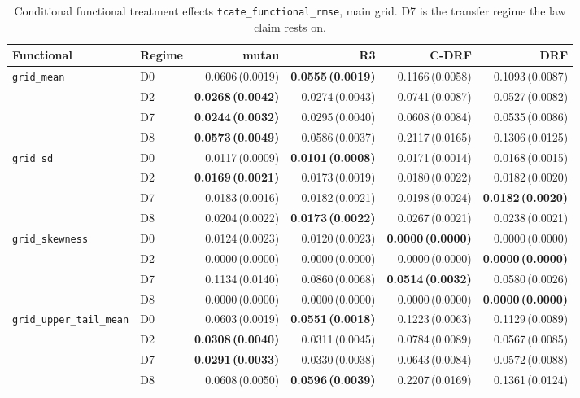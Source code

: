 \begin{table}[htbp]
\centering
\caption{Conditional functional treatment effects \texttt{tcate\_functional\_rmse}, main grid. D7 is the transfer regime the law claim rests on.}
\label{tab:p55-tcate}
\scriptsize
\setlength{\tabcolsep}{3.2pt}
\begin{tabular}{@{}llrrrr@{}}
\toprule
Functional & Regime & mutau & R3 & C-DRF & DRF \\
\midrule
\texttt{grid\_mean} & D0 & 0.0606\,(0.0019) & \textbf{0.0555\,(0.0019)} & 0.1166\,(0.0058) & 0.1093\,(0.0087) \\
 & D2 & \textbf{0.0268\,(0.0042)} & 0.0274\,(0.0043) & 0.0741\,(0.0087) & 0.0527\,(0.0082) \\
 & D7 & \textbf{0.0244\,(0.0032)} & 0.0295\,(0.0040) & 0.0608\,(0.0084) & 0.0535\,(0.0086) \\
 & D8 & \textbf{0.0573\,(0.0049)} & 0.0586\,(0.0037) & 0.2117\,(0.0165) & 0.1306\,(0.0125) \\
\midrule
\texttt{grid\_sd} & D0 & 0.0117\,(0.0009) & \textbf{0.0101\,(0.0008)} & 0.0171\,(0.0014) & 0.0168\,(0.0015) \\
 & D2 & \textbf{0.0169\,(0.0021)} & 0.0173\,(0.0019) & 0.0180\,(0.0022) & 0.0182\,(0.0020) \\
 & D7 & 0.0183\,(0.0016) & 0.0182\,(0.0021) & 0.0198\,(0.0024) & \textbf{0.0182\,(0.0020)} \\
 & D8 & 0.0204\,(0.0022) & \textbf{0.0173\,(0.0022)} & 0.0267\,(0.0021) & 0.0238\,(0.0021) \\
\midrule
\texttt{grid\_skewness} & D0 & 0.0124\,(0.0023) & 0.0120\,(0.0023) & \textbf{0.0000\,(0.0000)} & 0.0000\,(0.0000) \\
 & D2 & 0.0000\,(0.0000) & 0.0000\,(0.0000) & 0.0000\,(0.0000) & \textbf{0.0000\,(0.0000)} \\
 & D7 & 0.1134\,(0.0140) & 0.0860\,(0.0068) & \textbf{0.0514\,(0.0032)} & 0.0580\,(0.0026) \\
 & D8 & 0.0000\,(0.0000) & 0.0000\,(0.0000) & 0.0000\,(0.0000) & \textbf{0.0000\,(0.0000)} \\
\midrule
\texttt{grid\_upper\_tail\_mean} & D0 & 0.0603\,(0.0019) & \textbf{0.0551\,(0.0018)} & 0.1223\,(0.0063) & 0.1129\,(0.0089) \\
 & D2 & \textbf{0.0308\,(0.0040)} & 0.0311\,(0.0045) & 0.0784\,(0.0089) & 0.0567\,(0.0085) \\
 & D7 & \textbf{0.0291\,(0.0033)} & 0.0330\,(0.0038) & 0.0643\,(0.0084) & 0.0572\,(0.0088) \\
 & D8 & 0.0608\,(0.0050) & \textbf{0.0596\,(0.0039)} & 0.2207\,(0.0169) & 0.1361\,(0.0124) \\
\bottomrule
\end{tabular}
\end{table}

